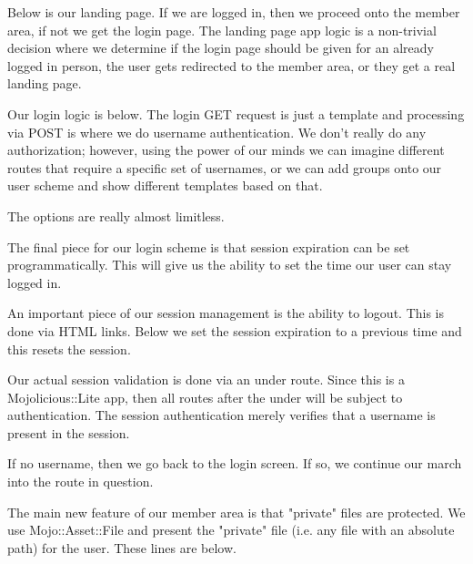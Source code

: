 \documentclass[14pt]{extreport}
\newcommand\Small{\fontsize{12}{13.0}\fontencoding{T1}\selectfont}
\newcommand*\LSTfont{\Small\ttfamily\SetTracking{encoding=*}{-60}\lsstyle}
\begin{document}
Below is our landing page.  If we are logged in, then we proceed onto the
member area, if not we get the login page.  The landing page app logic is a
non-trivial decision where we determine if the login page should be given for
an already logged in person, the user gets redirected to the member area, or
they get a real landing page.



Our login logic is below.  The login GET request is just a template and
processing via POST is where we do username authentication.  We don't really do
any authorization; however, using the power of our minds we can imagine
different routes that require a specific set of usernames, or we can add groups
onto our user scheme and show different templates based on that.

The options are really almost limitless.



The final piece for our login scheme is that session expiration can be set
programmatically.  This will give us the ability to set the time our user can
stay logged in.

An important piece of our session management is the ability to logout.  This is
done via HTML links.  Below we set the session expiration to a previous time
and this resets the session.



Our actual session validation is done via an under route.  Since this is a
Mojolicious::Lite app, then all routes after the under will be subject to
authentication.  The session authentication merely verifies that a username is
present in the session.

If no username, then we go back to the login screen.  If so, we continue our
march into the route in question.



The main new feature of our member area is that "private" files are protected.
We use Mojo::Asset::File and present the "private" file (i.e. any file with an
absolute path) for the user.  These lines are below.


\end{document}
